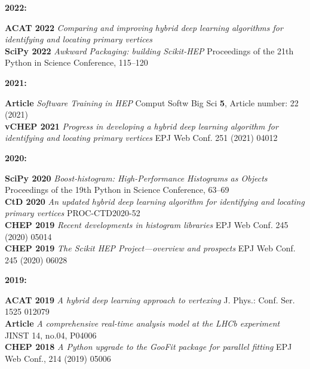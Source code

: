 \documentclass[10pt,letterpaper]{moderncv}
\begin{document}
\begin{minipage}[t]{.06\textwidth}
\textbf{2022:}
\end{minipage}%
\begin{minipage}[t]{.94\textwidth}
\textbf{ACAT 2022} \emph{Comparing and improving hybrid deep learning algorithms for identifying and locating primary vertices} \\
\textbf{SciPy 2022} \emph{Awkward Packaging: building Scikit-HEP} Proceedings of the 21th Python in Science Conference, 115--120
\end{minipage}

\begin{minipage}[t]{.06\textwidth}
\textbf{2021:}
\end{minipage}%
\begin{minipage}[t]{.94\textwidth}
\textbf{Article} \emph{Software Training in HEP} Comput Softw Big Sci \textbf{5}, Article number: 22 (2021) \\
\textbf{vCHEP 2021} \emph{Progress in developing a hybrid deep learning algorithm for identifying and locating primary vertices} EPJ Web Conf. 251 (2021) 04012
\end{minipage}

\begin{minipage}[t]{.06\textwidth}
\textbf{2020:}
\end{minipage}%
\begin{minipage}[t]{.94\textwidth}
\textbf{SciPy 2020} \emph{Boost-histogram: High-Performance Histograms as Objects} Proceedings of the 19th Python in Science Conference, 63--69 \\
\textbf{CtD 2020}   \emph{An updated hybrid deep learning algorithm for identifying and locating primary vertices} PROC-CTD2020-52 \\
\textbf{CHEP 2019}  \emph{Recent developments in histogram libraries} EPJ Web Conf. 245 (2020) 05014 \\
\textbf{CHEP 2019}  \emph{The Scikit HEP Project---overview and prospects} EPJ Web Conf. 245 (2020) 06028
\end{minipage}

\begin{minipage}[t]{.06\textwidth}
\textbf{2019:}
\end{minipage}%
\begin{minipage}[t]{.94\textwidth}
\textbf{ACAT 2019} \emph{A hybrid deep learning approach to vertexing} J. Phys.: Conf. Ser. 1525 012079 \\
\textbf{Article}   \emph{A comprehensive real-time analysis model at the LHCb experiment} JINST 14, no.04, P04006 \\
\textbf{CHEP 2018} \emph{A Python upgrade to the GooFit package for parallel fitting} EPJ Web Conf., 214 (2019) 05006
\end{minipage}
\end{document}
